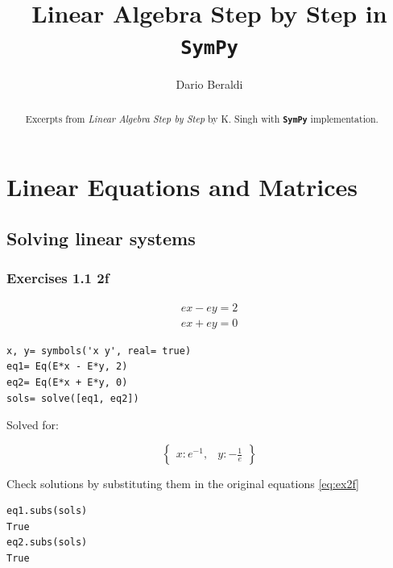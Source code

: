 \documentclass[a4paper]{article}
\newcommand{\sympy}{\textbf{\texttt{\textcolor{OliveGreen}{SymPy}} }}
\begin{document}
\title{Linear Algebra Step by Step in \sympy}

\author{Dario Beraldi}
\maketitle
\tableofcontents

\begin{abstract}
Excerpts from \textit{Linear Algebra Step by Step} by K. Singh 
with \sympy implementation.
\end{abstract}

\section{Linear Equations and Matrices}

\subsection{Solving linear systems}

\subsubsection{Exercises 1.1 2f} 

\begin{equation}\label{eq:ex2f}
    \begin{matrix}
    e x - e y = 2 \\
    e x + e y = 0
    \end{matrix}
\end{equation}

\begin{verbatim}
x, y= symbols('x y', real= true)
eq1= Eq(E*x - E*y, 2)
eq2= Eq(E*x + E*y, 0)
sols= solve([eq1, eq2])
\end{verbatim}

Solved for:

\begin{equation}\label{eq:ex2fsol}
\begin{Bmatrix}x : e^{-1}, & y : - \frac{1}{e}\end{Bmatrix}
\end{equation}

Check solutions by substituting them in the original equations \ref{eq:ex2f}

\begin{verbatim}
eq1.subs(sols)
True
eq2.subs(sols)
True
\end{verbatim}
\end{document}
